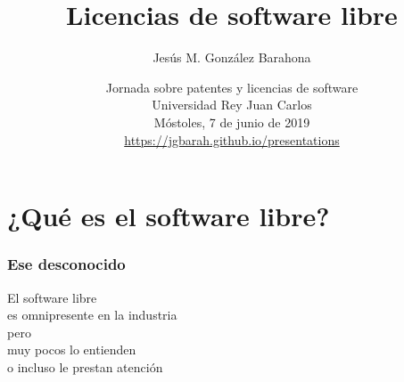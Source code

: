 \documentclass[17pt,aspectratio=169]{beamer}
\begin{document}
\title{Licencias de software libre}
\author{Jesús M. González Barahona}

\date{Jornada sobre patentes y licencias de software \\
  Universidad Rey Juan Carlos \\
  Móstoles, 7 de junio de 2019\\
{\small \url{https://jgbarah.github.io/presentations}} \\}

\frame{
\maketitle
}




\section{¿Qué es el software libre?}


\begin{frame}
\frametitle{Ese desconocido}

\begin{center}
  {\Large
  El software libre \\
  es omnipresente en la industria \\
  pero \\
  muy pocos lo entienden \\
  o incluso le prestan atención \\
  }
\end{center}

\end{frame}

\end{document}
